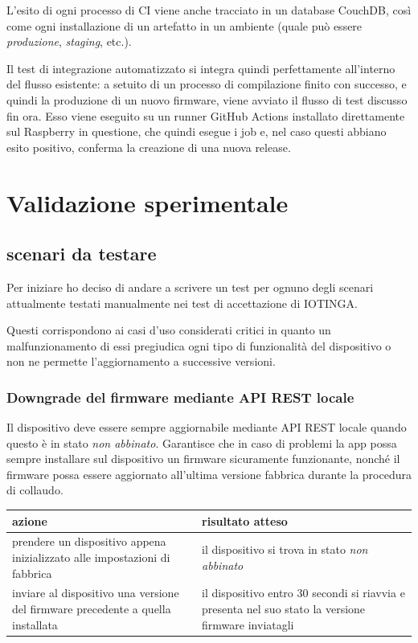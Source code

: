 \documentclass[a4paper,titlepage]{article}
\begin{document}
L'esito di ogni processo di CI viene anche tracciato in un database CouchDB,
così come ogni installazione di un artefatto in un ambiente (quale può essere
\textit{produzione}, \textit{staging}, etc.).

Il test di integrazione automatizzato si integra quindi perfettamente all'interno
del flusso esistente: a setuito di un processo di compilazione finito con successo,
e quindi la produzione di un nuovo firmware, viene avviato il flusso di test discusso
fin ora. Esso viene eseguito su un runner GitHub Actions installato direttamente
sul Raspberry in questione, che quindi esegue i job e, nel caso questi abbiano
esito positivo, conferma la creazione di una nuova release.

\section{Validazione sperimentale}

\subsection{scenari da testare}

Per iniziare ho deciso di andare a scrivere un test per ognuno degli scenari attualmente
testati manualmente nei test di accettazione di IOTINGA.

Questi corrispondono ai casi d'uso considerati critici in quanto un malfunzionamento
di essi pregiudica ogni tipo di funzionalità del dispositivo o non ne permette l'aggiornamento
a successive versioni.

\subsubsection{Downgrade del firmware mediante API REST locale}
Il dispositivo deve essere sempre aggiornabile mediante API REST locale quando questo
è in stato \textit{non abbinato}. Garantisce che in caso di problemi la app possa sempre
installare sul dispositivo un firmware sicuramente funzionante, nonché il firmware
possa essere aggiornato all’ultima versione fabbrica durante la procedura di collaudo.

\begin{center}
\begin{tabular}{| p{5cm} | p{5cm} |}
    \hline \textbf{azione} & \textbf{risultato atteso} \\
    \hline prendere un dispositivo appena inizializzato alle impostazioni di fabbrica & il dispositivo si trova in stato \textit{non abbinato} \\
    \hline inviare al dispositivo una versione del firmware precedente a quella installata & il dispositivo entro 30 secondi si riavvia e presenta nel suo stato la versione firmware inviatagli \\
    \hline
\end{tabular}
\end{center}
\end{document}
